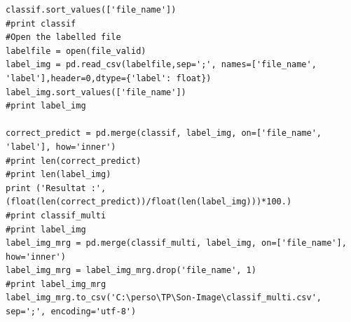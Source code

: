 \documentclass{book}
\begin{document}
\begin{verbatim}
classif.sort_values(['file_name'])
#print classif            
#Open the labelled file
labelfile = open(file_valid)
label_img = pd.read_csv(labelfile,sep=';', names=['file_name', 'label'],header=0,dtype={'label': float})
label_img.sort_values(['file_name'])
#print label_img

correct_predict = pd.merge(classif, label_img, on=['file_name', 'label'], how='inner')
#print len(correct_predict)
#print len(label_img)
print ('Resultat :', (float(len(correct_predict))/float(len(label_img)))*100.)
#print classif_multi
#print label_img
label_img_mrg = pd.merge(classif_multi, label_img, on=['file_name'], how='inner')
label_img_mrg = label_img_mrg.drop('file_name', 1)
#print label_img_mrg
label_img_mrg.to_csv('C:\perso\TP\Son-Image\classif_multi.csv', sep=';', encoding='utf-8')
\end{verbatim}

\backmatter

\listoftables

\listoffigures



\end{document}
